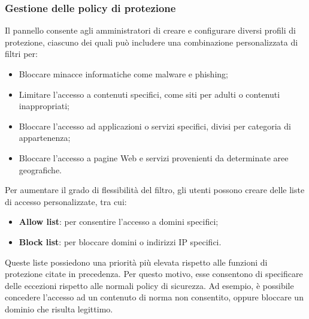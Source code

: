 \subsubsection{Gestione delle policy di protezione}
Il pannello consente agli amministratori di creare e configurare diversi profili di protezione, ciascuno dei quali può includere una combinazione personalizzata di filtri per:
\begin{itemize}
  \item Bloccare minacce informatiche come malware e phishing;
  \item Limitare l'accesso a contenuti specifici, come siti per adulti o contenuti inappropriati;
  \item Bloccare l'accesso ad applicazioni o servizi specifici, divisi per categoria di appartenenza;
  \item Bloccare l'accesso a pagine Web e servizi provenienti da determinate aree geografiche.
\end{itemize}
Per aumentare il grado di flessibilità del filtro, gli utenti possono creare delle liste di accesso personalizzate, tra cui:
\begin{itemize}
  \item \textbf{Allow list}: per consentire l'accesso a domini specifici;
  \item \textbf{Block list}: per bloccare domini o indirizzi IP specifici.
\end{itemize}
Queste liste possiedono una priorità più elevata rispetto alle funzioni di protezione citate in precedenza. Per questo motivo, esse consentono di specificare delle eccezioni rispetto alle normali policy di sicurezza. Ad esempio, è possibile concedere l'accesso ad un contenuto di norma non consentito, oppure bloccare un dominio che risulta legittimo.

